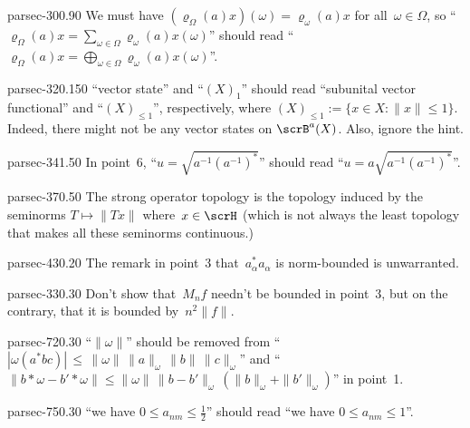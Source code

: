 \documentclass[b5page]{book}
\begin{document}
\begin{erratum}{parsec-300.90}
We must have $(\varrho_\Omega(a)x)(\omega)
= \varrho_\omega(a)x$
for all~$\omega\in\Omega$,
so
``$\varrho_\Omega(a)x = \sum_{\omega\in\Omega}
\varrho_\omega(a)x(\omega)$''
should read
``$\varrho_\Omega(a)x = \bigoplus_{\omega\in\Omega}
\varrho_\omega(a)x(\omega)$''.
\end{erratum}
\begin{erratum}{parsec-320.150}
``vector state'' and ``$(X)_1$''
should read ``subunital vector functional''
and ``$(X)_{\leq 1}$'', respectively,
where $(X)_{\leq 1} := 
\{x\in X\colon \|x\|\leq 1\}$.
Indeed, there might
not be any vector states on $\scrB^a(X)$.
Also, ignore the hint.
\end{erratum}
\begin{erratum}{parsec-341.50}
In point~6, ``$u=\sqrt{a^{-1}(a^{-1})^*}$''
should read ``$u=a\sqrt{a^{-1}(a^{-1})^*}$''.
\end{erratum}
\begin{erratum}{parsec-370.50}
The strong operator topology is the topology
induced by the seminorms $T\mapsto \|Tx\|$ where~$x\in \scrH$
(which is not always the least topology that makes
all these seminorms continuous.)
\end{erratum}
\begin{erratum}{parsec-430.20}
The remark in point~3 that~$a_\alpha^*a_\alpha$
is norm-bounded is unwarranted.
\end{erratum}
\begin{erratum}{parsec-330.30}
Don't show that~$M_nf$ needn't be bounded
in point~3,
but on the contrary, that it is bounded by~$n^2\|f\|$.
\end{erratum}
\begin{erratum}{parsec-720.30}
``$\|\omega\|$''
should be removed
from
``$\left|\omega(a^*bc)\right|\,\leq\,
\|\omega\|\,\|a\|_\omega\,\|b\|\,\|c\|_\omega$''
and 
``$\|b\ast \omega-b'\ast \omega\|
\leq \|\omega\|\,\|b-b'\|_\omega\,(\|b\|_\omega+\|b'\|_\omega)$''
in point~1.
\end{erratum}
\begin{erratum}{parsec-750.30}
``we have $0\leq a_{nm}\leq \frac{1}{2}$''
should read ``we have $0\leq a_{nm}\leq 1$''.
\end{erratum}
\end{document}
